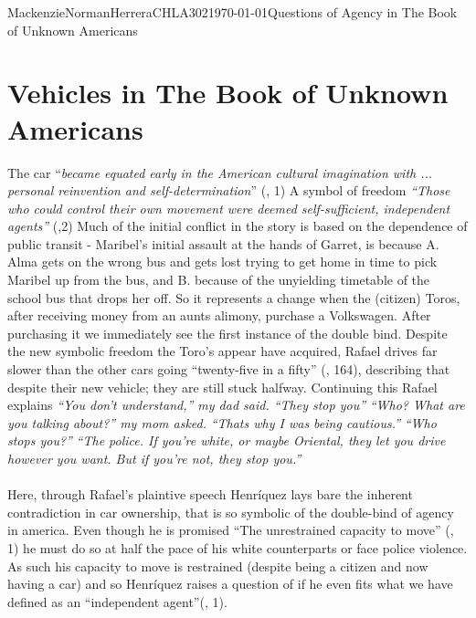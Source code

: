 \documentclass{article}
\begin{document}
\begin{mla}{Mackenzie}{Norman}{Herrera}{CHLA302}{\today}{Questions of Agency in The Book of Unknown Americans}
\section*{Vehicles in The Book of Unknown Americans}
The car ``\textit{became equated early in the American cultural imagination with ... personal reinvention and self-determination}'' (\cite{Uhlman2015-qx}, 1) A symbol of freedom \textit{``Those who could control their own movement were deemed self-sufficient, independent agents''} (\cite{Uhlman2015-qx},2) Much of the initial conflict in the story is based on the dependence of public transit - Maribel's initial assault at the hands of Garret, is because A. Alma gets on the wrong bus and gets lost trying to get home in time to pick Maribel up from the bus, and B. because of the unyielding timetable of the school bus that drops her off. So it represents a change when the (citizen) Toros, after receiving money from an aunts alimony, purchase a Volkswagen. After purchasing it we immediately see the first instance of the double bind. Despite the new symbolic freedom the Toro's appear have acquired, Rafael drives far slower than the other cars going ``twenty-five in a fifty'' (\cite{Henriquez2014-sh}, 164), describing that despite their new vehicle; they are still stuck halfway. Continuing this Rafael explains
\noindent\linebreak
\textit{``You don't understand,'' my dad said. ``They stop you''}
\noindent\linebreak
\textit{``Who? What are you talking about?'' my mom asked.}
\noindent\linebreak
\textit{``Thats why I was being cautious.''}
\noindent\linebreak
\textit{``Who stops you?''}
\noindent\linebreak
\textit{``The police. If you're white, or maybe Oriental, they let you drive however you want. But if you're not, they stop you.''}
\paragraph{}
Here, through Rafael's plaintive speech Henríquez lays bare the inherent contradiction in car ownership, that is so symbolic of the double-bind of agency in america. Even though he is promised ``The unrestrained capacity to move'' (\cite{Uhlman2015-qx}, 1) he must do so at half the pace of his white counterparts or face police violence. As such his capacity to move is restrained (despite being a citizen and now having a car) and so Henríquez raises a question of if he even fits what we have defined as an ``independent agent''(\cite{Uhlman2015-qx}, 1).


\end{mla}
\end{document}
